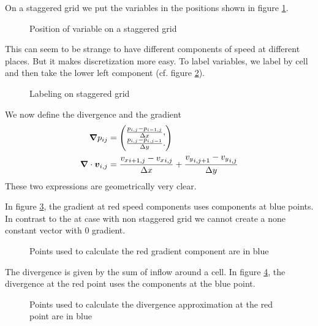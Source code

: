 On a staggered grid we put the variables in the positions shown in figure \ref{fixed:staggered}.
\begin{figure}
\caption{Position of variable on a staggered grid}
\label{fixed:staggered}
\end{figure}

This can seem to be strange to have different components of speed at different places. But it makes discretization more easy.
To label variables, we label by cell and then take the lower left component (cf. figure \ref{fixed:staggered_label}).
\begin{figure}
\caption{Labeling on staggered grid}
\label{fixed:staggered_label}
\end{figure}

We now define the divergence and the gradient
\begin{align}
  {\boldsymbol {\nabla}}p_{ij}&=\begin{pmatrix}
    \frac{p_{i,j}-p_{i-1,j}}{\Delta x},\\
    \frac{p_{i,j}-p_{i,j-1}}{\Delta y}.\\
                      \end{pmatrix}\\
  {\boldsymbol {\nabla}}\cdot {\boldsymbol {v}}_{i,j}&=\frac{{v_{x}}_{i+1,j}-{v_{x}}_{i,j}}{\Delta x}+\frac{{v_{y}}_{i,j+1}-{v_{y}}_{i,j}}{\Delta y}
\end{align}
These two expressions are geometrically very clear.

In figure \ref{fixed:staggered_gradient}, the gradient at red speed components uses components at blue points.
In contrast to the at case with non staggered grid we cannot create a none constant vector with 0 gradient.
\begin{figure}
\caption{Points used to calculate the red gradient component are in blue}
\label{fixed:staggered_gradient}
\end{figure}

The divergence is given by the sum of inflow around a cell.
In figure \ref{fixed:staggered_divergence}, the divergence at the red point uses the components at the blue point.
\begin{figure}
\caption{Points used to calculate the divergence approximation at the red point are in blue}
\label{fixed:staggered_divergence}
\end{figure}

